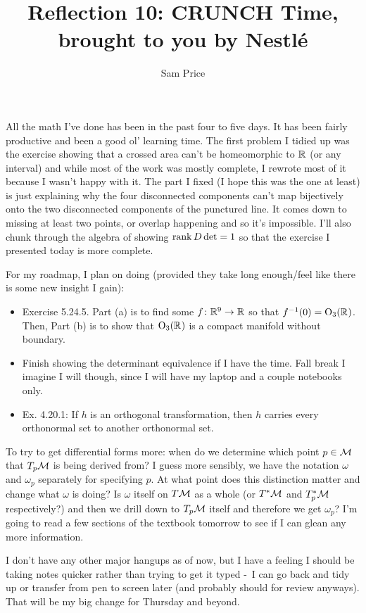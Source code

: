 \documentclass[12pt]{article}
\author{Sam Price}
\title{Reflection 10: CRUNCH Time, brought to you by Nestl\'e}
\begin{document}
\maketitle

All the math I've done has been in the past four to five days.
It has been fairly productive and been a good ol' learning time.
The first problem I tidied up was the exercise showing that a crossed area can't be homeomorphic to $\RR$ (or any interval)
and while most of the work was mostly complete, I rewrote most of it because I wasn't happy with it.
The part I fixed (I hope this was the one at least) is just explaining why the four disconnected components can't map bijectively
onto the two disconnected components of the punctured line. It comes down to missing at least two points, or overlap happening and so it's impossible.
I'll also chunk through the algebra of showing $\rank D\det = 1$ so that the exercise I presented today is more complete.

For my roadmap, I plan on doing (provided they take long enough/feel like there is some new insight I gain):
\begin{itemize}
  \item Exercise 5.24.5. Part (a) is to find some $f \from \RR[9] \to \RR$ so that $f\inv(0) = \Orth_{3}(\RR)$.
        Then, Part (b) is to show that $\Orth_{3}(\RR)$ is a compact manifold without boundary.
  \item Finish showing the determinant equivalence if I have the time.
        Fall break I imagine I will though, since I will have my laptop and a couple notebooks only.
  \item Ex. 4.20.1: If $h$ is an orthogonal transformation, then $h$ carries every orthonormal set to another orthonormal set.
\end{itemize}

To try to get differential forms more: when do we determine which point $p \in \M$ that $T_{p}\M$ is being derived from?
I guess more sensibly, we have the notation $\omega$ and $\omega_{p}$ separately for specifying $p$. At what point does this distinction matter
and change what $\omega$ is doing? Is $\omega$ itself on $T\M$ as a whole (or $T^{\ast}\M$ and $T^{\ast}_{p}\M$ respectively?)
and then we drill down to $T_{p}\M$ itself and therefore we get $\omega_{p}$?
I'm going to read a few sections of the textbook tomorrow to see if I can glean any more information.

I don't have any other major hangups as of now, but I have a feeling I should be taking notes quicker rather than trying to get it
typed -\ I can go back and tidy up or transfer from pen to screen later (and probably should for review anyways).
That will be my big change for Thursday and beyond.
\end{document}
